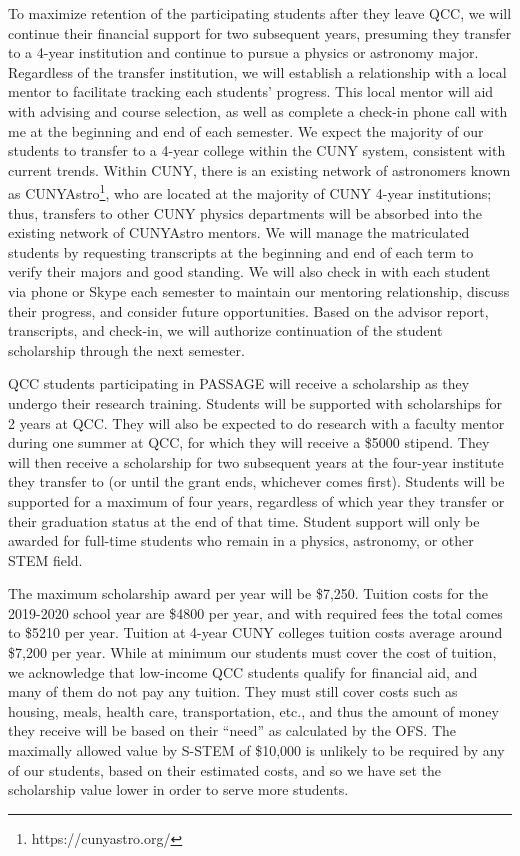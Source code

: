 \documentclass[12pt]{article}
\begin{document}
To maximize retention of the participating students after they leave QCC, we will continue their financial support for two subsequent years, presuming they transfer to a 4-year institution and continue to pursue a physics or astronomy major.  Regardless of the transfer institution, we will establish a relationship with a local mentor to facilitate tracking each students' progress.  This local mentor will aid with advising and course selection, as well as complete a check-in phone call with me at the beginning and end of each semester.  We expect the majority of our students to transfer to a 4-year college within the CUNY system, consistent with current trends.  Within CUNY, there is an existing network of astronomers known as CUNYAstro\footnote{https://cunyastro.org/}, who are located at the majority of CUNY 4-year institutions; thus, transfers to other CUNY physics departments will be absorbed into the existing network of CUNYAstro  mentors.  We will manage the matriculated students by requesting transcripts at the beginning and end of each term to verify their majors and good standing.  We will also check in with each student via phone or Skype each semester to maintain our mentoring relationship, discuss their progress, and consider future opportunities.  Based on the advisor report, transcripts, and check-in, we will authorize continuation of the student scholarship through the next semester.  

QCC students participating in PASSAGE will receive a scholarship as they undergo their research training. Students will be supported with scholarships for 2 years at QCC.  They will also be expected to do research with a faculty mentor during one summer at QCC, for which they will receive a \$5000 stipend.  They will then receive a scholarship for two subsequent years at the four-year institute they transfer to (or until the grant ends, whichever comes first).  Students will be supported for a maximum of four years, regardless of which year they transfer or their graduation status at the end of that time. Student support will only be awarded for full-time students who remain in a physics, astronomy, or other STEM field.  

The maximum scholarship award per year will be \$7,250.  Tuition costs for the 2019-2020 school year are \$4800 per year, and with required fees the total comes to \$5210 per year.  Tuition at 4-year CUNY colleges tuition costs average around \$7,200 per year.  While at minimum our students must cover the cost of tuition, we acknowledge that low-income QCC students qualify for financial aid, and many of them do not pay any tuition.  They must still cover costs such as housing, meals, health care, transportation, etc., and thus the amount of money they receive will be based on their ``need'' as calculated by the OFS.   The maximally allowed value by S-STEM of \$10,000 is unlikely to be required by any of our students, based on their estimated costs, and so we have set the scholarship value lower in order to serve more students.
\end{document}
